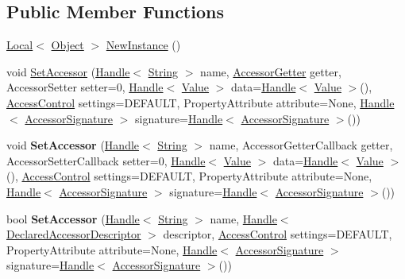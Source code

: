 \subsection*{Public Member Functions}
\begin{DoxyCompactItemize}
\item 
\hyperlink{classv8_1_1_local}{Local}$<$ \hyperlink{classv8_1_1_object}{Object} $>$ \hyperlink{classv8_1_1_object_template_ad25d8ebf37b1a3aaf7d4a03b1a9bd5c1}{New\+Instance} ()
\item 
void \hyperlink{classv8_1_1_object_template_a912ade2f7db7c7e30b606d10012c2bac}{Set\+Accessor} (\hyperlink{classv8_1_1_handle}{Handle}$<$ \hyperlink{classv8_1_1_string}{String} $>$ name, \hyperlink{namespacev8_a3016fe071826349d1370a700e71be094}{Accessor\+Getter} getter, Accessor\+Setter setter=0, \hyperlink{classv8_1_1_handle}{Handle}$<$ \hyperlink{classv8_1_1_value}{Value} $>$ data=\hyperlink{classv8_1_1_handle}{Handle}$<$ \hyperlink{classv8_1_1_value}{Value} $>$(), \hyperlink{namespacev8_a31d8355cb043d7d2dda3f4a52760b64e}{Access\+Control} settings=D\+E\+F\+A\+U\+L\+T, Property\+Attribute attribute=None, \hyperlink{classv8_1_1_handle}{Handle}$<$ \hyperlink{classv8_1_1_accessor_signature}{Accessor\+Signature} $>$ signature=\hyperlink{classv8_1_1_handle}{Handle}$<$ \hyperlink{classv8_1_1_accessor_signature}{Accessor\+Signature} $>$())
\item 
\hypertarget{classv8_1_1_object_template_acf245fcdedc797068a1eb4c8d46a5269}{}void {\bfseries Set\+Accessor} (\hyperlink{classv8_1_1_handle}{Handle}$<$ \hyperlink{classv8_1_1_string}{String} $>$ name, Accessor\+Getter\+Callback getter, Accessor\+Setter\+Callback setter=0, \hyperlink{classv8_1_1_handle}{Handle}$<$ \hyperlink{classv8_1_1_value}{Value} $>$ data=\hyperlink{classv8_1_1_handle}{Handle}$<$ \hyperlink{classv8_1_1_value}{Value} $>$(), \hyperlink{namespacev8_a31d8355cb043d7d2dda3f4a52760b64e}{Access\+Control} settings=D\+E\+F\+A\+U\+L\+T, Property\+Attribute attribute=None, \hyperlink{classv8_1_1_handle}{Handle}$<$ \hyperlink{classv8_1_1_accessor_signature}{Accessor\+Signature} $>$ signature=\hyperlink{classv8_1_1_handle}{Handle}$<$ \hyperlink{classv8_1_1_accessor_signature}{Accessor\+Signature} $>$())\label{classv8_1_1_object_template_acf245fcdedc797068a1eb4c8d46a5269}

\item 
\hypertarget{classv8_1_1_object_template_a6d0f431e75ea6d192588da4cb7ffd6c6}{}bool {\bfseries Set\+Accessor} (\hyperlink{classv8_1_1_handle}{Handle}$<$ \hyperlink{classv8_1_1_string}{String} $>$ name, \hyperlink{classv8_1_1_handle}{Handle}$<$ \hyperlink{classv8_1_1_declared_accessor_descriptor}{Declared\+Accessor\+Descriptor} $>$ descriptor, \hyperlink{namespacev8_a31d8355cb043d7d2dda3f4a52760b64e}{Access\+Control} settings=D\+E\+F\+A\+U\+L\+T, Property\+Attribute attribute=None, \hyperlink{classv8_1_1_handle}{Handle}$<$ \hyperlink{classv8_1_1_accessor_signature}{Accessor\+Signature} $>$ signature=\hyperlink{classv8_1_1_handle}{Handle}$<$ \hyperlink{classv8_1_1_accessor_signature}{Accessor\+Signature} $>$())\label{classv8_1_1_object_template_a6d0f431e75ea6d192588da4cb7ffd6c6}


\end{DoxyCompactItemize}
